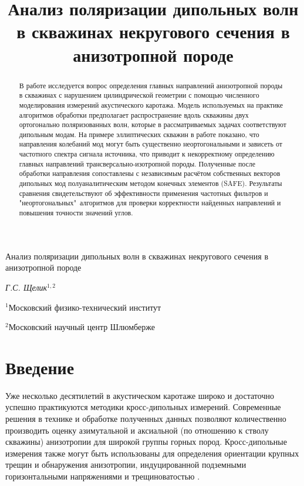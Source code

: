 \documentclass[a4paper,11pt]{article}
\begin{document}

{\LARGE \bfseries \par \noindent Анализ поляризации дипольных волн в скважинах некругового сечения в анизотропной породе}
\par\bigskip

{\centering \itshape Г.С. Щелик$^{1,2}$ \par}
\medskip
{\centering \footnotesize
	$^1${Московский физико-технический институт} \par
	$^2${Московский научный центр Шлюмберже}
	\par}
\par\bigskip


\title{Анализ поляризации дипольных волн в скважинах некругового сечения в анизотропной породе}	
\begin{abstract}

В работе исследуется вопрос	определения главных направлений анизотропной породы в скважинах с нарушением цилиндрической геометрии с помощью численного моделирования измерений акустического каротажа. Модель используемых на практике алгоритмов обработки предполагает распространение вдоль скважины двух ортогонально поляризованных волн, которые в рассматриваемых задачах соответствуют дипольным модам. На примере эллиптических скважин в работе показано, что направления колебаний мод могут быть существенно неортогональными и зависеть от частотного спектра сигнала источника, что приводит к некорректному определению главных направлений трансверсально-изотропной породы. Полученные после обработки направления сопоставлены с независимым расчётом собственных векторов дипольных мод полуаналитическим методом конечных элементов (SAFE). Результаты сравнения свидетельствуют об эффективности применения частотных фильтров и "неортогональных"\ алгоритмов для проверки корректности найденных направлений и повышения точности значений углов. %
\end{abstract}

\section{Введение}
Уже несколько десятилетий в акустическом каротаже широко и достаточно успешно практикуются методики кросс-дипольных измерений. Современные решения в технике и обработке полученных данных позволяют количественно производить оценку азимутальной и аксиальной (по отношению к стволу скважины) анизотропии для широкой группы горных пород. Кросс-дипольные измерения также могут быть использованы для определения ориентации крупных трещин и обнаружения анизотропии, индуцированной подземными горизонтальными напряжениями и трещиноватостью \cite{Patterson2001}.
\end{document}
